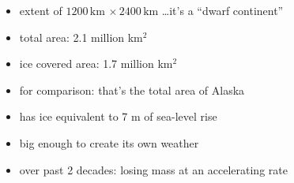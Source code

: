 \documentclass[hide notes,intlimits]{beamer}
\begin{document}
\begin{frame}[plain]
\end{frame}

  {
} 

\begin{frame}[plain]
    \begin{itemize}
    \item extent of $1200\,\text{km}\,\times 2400\,\text{km}$ \dots it's a ``dwarf continent''
    \item total area: 2.1 million km$^2$
    \item ice covered area:  1.7 million km$^2$
    \item \alert{for comparison: that's the total area of Alaska}
    \item has ice equivalent to 7 m of sea-level rise
    \item big enough to create its own weather
    \item over past 2 decades: losing mass at an accelerating rate
    \end{itemize}
\end{frame}


{
%
} 
\end{document}
